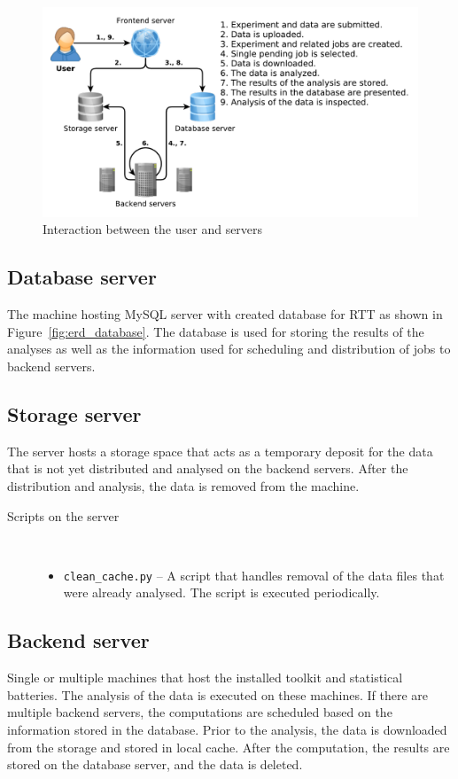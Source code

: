 \documentclass[
	digital,    %
	oneside,    %
	color,
	11pt,
	nocover,
	notable,
	nolof,
	nolot,
]{fithesis3}
\newenvironment{titlemize}[1]
{
	\begin{description}
	\item[#1]\
	\begin{itemize}
}
{
	\end{itemize}
 	\end{description}
}
\theoremstyle{definition}
\theoremstyle{remark}
\begin{document}
\begin{figure}[H]
\begin{nomar}
\centering
\includegraphics[width=\paperwidth-4cm]{figures/rtt-ecosystem.pdf}
\end{nomar}
\caption{Interaction between the user and servers}
\label{fig:rtt_ecosystem}
\end{figure}

\subsection{Database server}
The machine hosting MySQL server with created database for RTT as shown in Figure~\ref{fig:erd_database}. The database is used for storing the results of the analyses as well as the information used for scheduling and distribution of jobs to backend servers.

\subsection{Storage server}
The server hosts a storage space that acts as a temporary deposit for the data that is not yet distributed and analysed on the backend servers. After the distribution and analysis, the data is removed from the machine.

\begin{titlemize}{Scripts on the server}
\item \texttt{clean\_cache.py} -- A script that handles removal of the data files that were already analysed. The script is executed periodically.
\end{titlemize}

\subsection{Backend server}
Single or multiple machines that host the installed toolkit and statistical batteries. The analysis of the data is executed on these machines. If there are multiple backend servers, the computations are scheduled based on the information stored in the database. Prior to the analysis, the data is downloaded from the storage and stored in local cache. After the computation, the results are stored on the database server, and the data is deleted.
\end{document}
